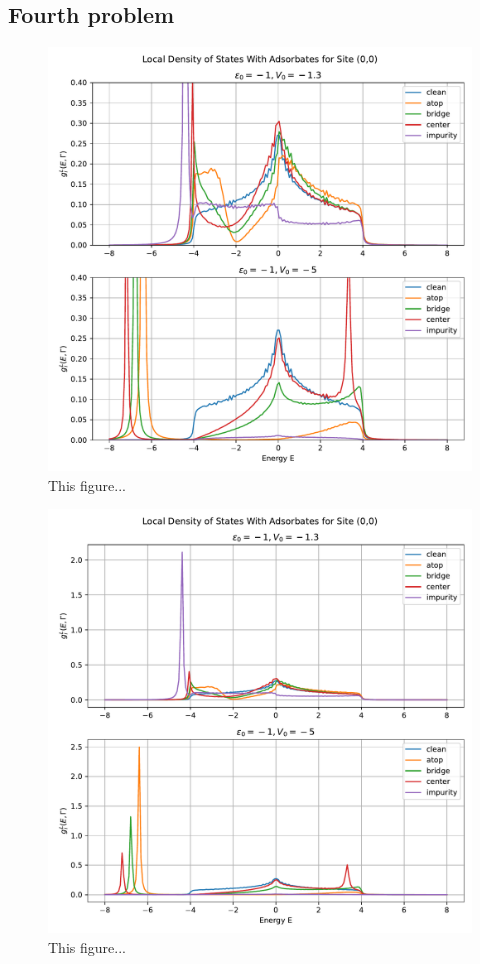 \subsection{Fourth problem}


\begin{figure}[H]
    \centering    \includegraphics[width=\textwidth]{Figures/task4(1).pdf}
    \caption{This figure...}
    \label{fig:task4(1)}
\end{figure}


\begin{figure}[H]
    \centering    \includegraphics[width=\textwidth]{Figures/task4.pdf}
    \caption{This figure...}
    \label{fig:task4}
\end{figure}